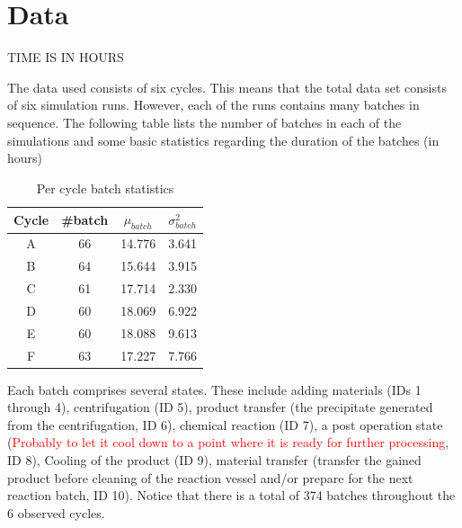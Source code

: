 \documentclass[../Thesis.tex]{subfiles}
\begin{document}
\chapter{Data}
TIME IS IN HOURS

The data used consists of six cycles. This means that the total data set consists of six simulation runs. However, each of the runs contains many batches in sequence. The following table lists the number of batches in each of the simulations and some basic statistics regarding the duration of the batches (in hours)

\begin{table}[h]
    \centering
    \begin{tabular}{c|c|c|c}
        Cycle & \#batch & $\mu_{batch}$ & $\sigma^2_{batch}$\\ \hline
        A & 66 & 14.776 & 3.641\\
        B & 64 & 15.644 & 3.915\\
        C & 61 & 17.714 & 2.330\\
        D & 60 & 18.069 & 6.922\\
        E & 60 & 18.088 & 9.613\\
        F & 63 & 17.227 & 7.766
    \end{tabular}
    \caption{Per cycle batch statistics}
    \label{tab:cycle basi stats}
\end{table}

Each batch comprises several states. These include adding materials (IDs 1 through 4), centrifugation (ID 5), product transfer (the precipitate generated from the centrifugation, ID 6), chemical reaction (ID 7), a post operation state (\textcolor{red}{Probably to let it cool down to a point where it is ready for further processing}, ID 8), Cooling of the product (ID 9), material transfer (transfer the gained product before cleaning of the reaction vessel and/or prepare for the next reaction batch, ID 10). Notice that there is a total of 374 batches throughout the 6 observed cycles.
\end{document}
